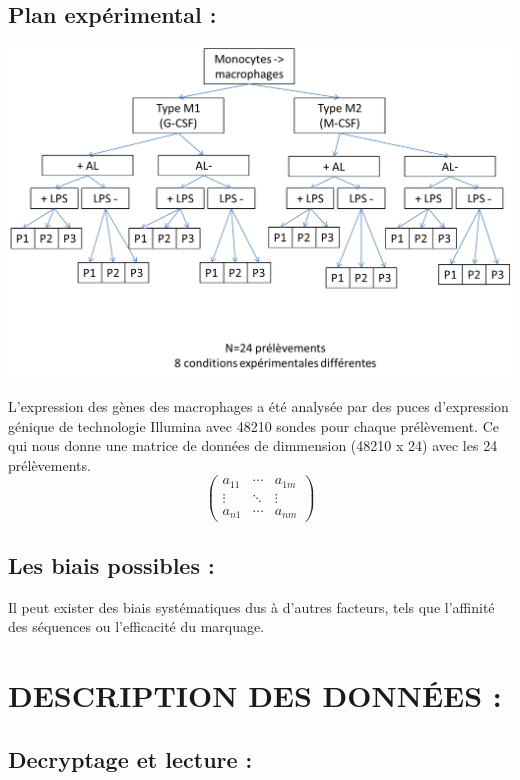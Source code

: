 \documentclass[a4paper,10pt]{article}
\begin{document}
\subsection{ Plan expérimental :}
\begin{center}
 \includegraphics[scale=0.5]{./image/plan.png}
\end{center}
L’expression des gènes des macrophages a été analysée par des puces d’expression génique de technologie Illumina avec 48210 sondes pour chaque prélèvement.
Ce qui nous donne une matrice de données de dimmension (48210 x 24) avec les 24 prélèvements.
\[
\begin{pmatrix}

   a_{11} & \cdots & a_{1m} \\

   \vdots & \ddots &\vdots \\

   a_{n1} & \cdots & a_{nm} 

\end{pmatrix}
\]
\subsection{Les biais possibles :}
 Il peut exister des biais systématiques dus à d'autres facteurs,
  tels que l'affinité des séquences ou l'efficacité du marquage. 
\section{DESCRIPTION DES DONN\'{E}ES :}
\subsection{ Decryptage et lecture :}
\end{document}
